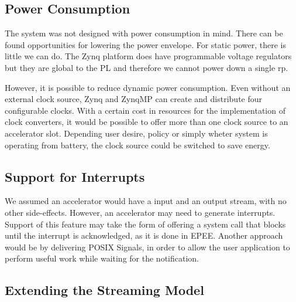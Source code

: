 

\subsection{Power Consumption}

The system was not designed with power consumption in mind. There can be found opportunities for lowering the power envelope.
For static power, there is little we can do. The Zynq platform does have programmable voltage regulators but they are global to the PL
and therefore we cannot power down a single \gls{rp}.

However, it is possible to reduce dynamic power consumption. Even without an external clock source, Zynq and ZynqMP can create and distribute
four configurable clocks. With a certain cost in resources for the implementation of clock converters, it would be possible to offer more than
one clock source to an accelerator slot. Depending user desire, policy or simply wheter system is operating from battery, the clock source 
could be switched to save energy.

\subsection{Support for Interrupts}

We assumed an accelerator would have a input and an output stream, with no other side-effects.
However, an accelerator may need to generate interrupts. Support of this feature may take the form of
offering a system call that blocks until the interrupt is acknowledged, as it is done in EPEE\cite{epee}.
Another approach would be by delivering POSIX Signals, in order to allow the user application to perform
useful work while waiting for the notification.

\subsection{Extending the Streaming Model}

